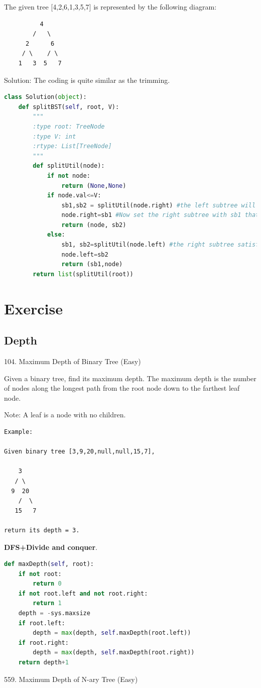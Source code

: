 \documentclass[../main.tex]{subfiles}
\begin{document}
The given tree [4,2,6,1,3,5,7] is represented by the following diagram:
\begin{lstlisting}
          4
        /   \
      2      6
     / \    / \
    1   3  5   7
\end{lstlisting}

Solution: The coding is quite similar as the trimming.
\begin{lstlisting}[language = Python]
class Solution(object):
    def splitBST(self, root, V):
        """
        :type root: TreeNode
        :type V: int
        :rtype: List[TreeNode]
        """
        def splitUtil(node):
            if not node:
                return (None,None)
            if node.val<=V:
                sb1,sb2 = splitUtil(node.right) #the left subtree will satisfy the condition, split the right subtree
                node.right=sb1 #Now set the right subtree with sb1 that
                return (node, sb2)
            else:
                sb1, sb2=splitUtil(node.left) #the right subtree satisfy the condition, split the left subtree
                node.left=sb2
                return (sb1,node)
        return list(splitUtil(root))
\end{lstlisting}

\section{Exercise}
\subsection{Depth}
104. Maximum Depth of Binary Tree (Easy)

Given a binary tree, find its maximum depth. The maximum depth is the number of nodes along the longest path from the root node down to the farthest leaf node.

Note: A leaf is a node with no children.
\begin{lstlisting}
Example:

Given binary tree [3,9,20,null,null,15,7],

    3
   / \
  9  20
    /  \
   15   7

return its depth = 3.
\end{lstlisting}
\textbf{DFS+Divide and conquer}.
\begin{lstlisting}[language=Python]
def maxDepth(self, root):
    if not root:
        return 0
    if not root.left and not root.right:
        return 1
    depth = -sys.maxsize
    if root.left:
        depth = max(depth, self.maxDepth(root.left))
    if root.right:
        depth = max(depth, self.maxDepth(root.right))
    return depth+1 
\end{lstlisting}
559. Maximum Depth of N-ary Tree (Easy)
\end{document}
